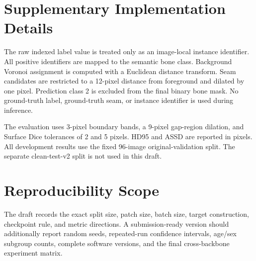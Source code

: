 \section{Supplementary Implementation Details}

The raw indexed label value is treated only as an image-local instance identifier. All positive identifiers are mapped to the semantic bone class. Background Voronoi assignment is computed with a Euclidean distance transform. Seam candidates are restricted to a 12-pixel distance from foreground and dilated by one pixel. Prediction class 2 is excluded from the final binary bone mask. No ground-truth label, ground-truth seam, or instance identifier is used during inference.

The evaluation uses 3-pixel boundary bands, a 9-pixel gap-region dilation, and Surface Dice tolerances of 2 and 5 pixels. HD95 and ASSD are reported in pixels. All development results use the fixed 96-image original-validation split. The separate clean-test-v2 split is not used in this draft.

\section{Reproducibility Scope}

The draft records the exact split size, patch size, batch size, target construction, checkpoint rule, and metric directions. A submission-ready version should additionally report random seeds, repeated-run confidence intervals, age/sex subgroup counts, complete software versions, and the final cross-backbone experiment matrix.
